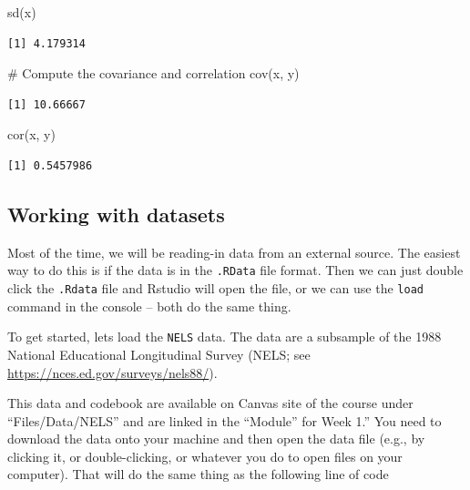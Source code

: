 \documentclass[
  letterpaper,
  DIV=11,
  numbers=noendperiod]{scrreprt}
\newenvironment{Shaded}{\begin{snugshade}}{\end{snugshade}}
\newcommand{\CommentTok}[1]{\textcolor[rgb]{0.37,0.37,0.37}{#1}}
\newcommand{\FunctionTok}[1]{\textcolor[rgb]{0.28,0.35,0.67}{#1}}
\newcommand{\NormalTok}[1]{\textcolor[rgb]{0.00,0.23,0.31}{#1}}
\begin{document}
\begin{Shaded}
\begin{Highlighting}[]
\FunctionTok{sd}\NormalTok{(x)}
\end{Highlighting}
\end{Shaded}

\begin{verbatim}
[1] 4.179314
\end{verbatim}

\begin{Shaded}
\begin{Highlighting}[]
\CommentTok{\# Compute the covariance and correlation}
\FunctionTok{cov}\NormalTok{(x, y)}
\end{Highlighting}
\end{Shaded}

\begin{verbatim}
[1] 10.66667
\end{verbatim}

\begin{Shaded}
\begin{Highlighting}[]
\FunctionTok{cor}\NormalTok{(x, y)}
\end{Highlighting}
\end{Shaded}

\begin{verbatim}
[1] 0.5457986
\end{verbatim}

\hypertarget{working-with-datasets}{%
\subsection{Working with datasets}\label{working-with-datasets}}

Most of the time, we will be reading-in data from an external source.
The easiest way to do this is if the data is in the \texttt{.RData} file
format. Then we can just double click the \texttt{.Rdata} file and
Rstudio will open the file, or we can use the \texttt{load} command in
the console -- both do the same thing.

To get started, lets load the \texttt{NELS} data. The data are a
subsample of the 1988 National Educational Longitudinal Survey (NELS;
see \url{https://nces.ed.gov/surveys/nels88/}).

This data and codebook are available on Canvas site of the course under
``Files/Data/NELS'' and are linked in the ``Module'' for Week 1.'' You
need to download the data onto your machine and then open the data file
(e.g., by clicking it, or double-clicking, or whatever you do to open
files on your computer). That will do the same thing as the following
line of code
\end{document}
